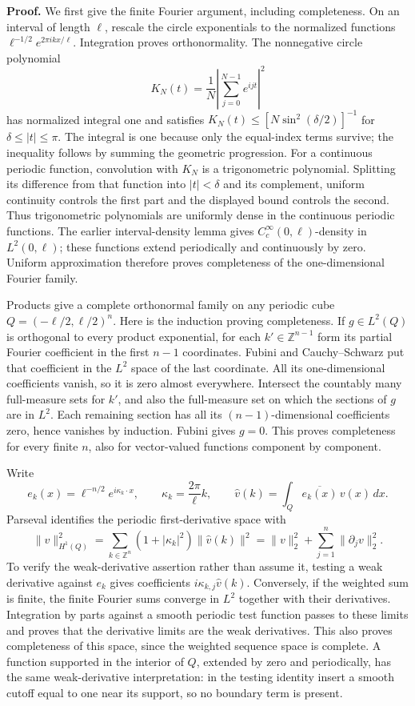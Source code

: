 \documentclass[
  11pt,
]{article}
\begin{document}
\textbf{Proof.} We first give the finite Fourier argument, including
completeness. On an interval of length \(\ell\), rescale the circle
exponentials to the normalized functions
\(\ell^{-1/2}e^{2\pi ikx/\ell}\). Integration proves orthonormality. The
nonnegative circle polynomial \[
K_N(t)=\frac1N\left|\sum_{j=0}^{N-1}e^{ijt}\right|^2
\] has normalized integral one and satisfies
\(K_N(t)\leq [N\sin^2(\delta/2)]^{-1}\) for \(\delta\leq |t|\leq\pi\).
The integral is one because only the equal-index terms survive; the
inequality follows by summing the geometric progression. For a
continuous periodic function, convolution with \(K_N\) is a
trigonometric polynomial. Splitting its difference from that function
into \(|t|<\delta\) and its complement, uniform continuity controls the
first part and the displayed bound controls the second. Thus
trigonometric polynomials are uniformly dense in the continuous periodic
functions. The earlier interval-density lemma gives
\(C_c^\infty(0,\ell)\)-density in \(L^2(0,\ell)\); these functions
extend periodically and continuously by zero. Uniform approximation
therefore proves completeness of the one-dimensional Fourier family.

Products give a complete orthonormal family on any periodic cube
\(Q=(-\ell/2,\ell/2)^n\). Here is the induction proving completeness. If
\(g\in L^2(Q)\) is orthogonal to every product exponential, for each
\(k'\in\mathbb Z^{n-1}\) form its partial Fourier coefficient in the
first \(n-1\) coordinates. Fubini and Cauchy--Schwarz put that
coefficient in the \(L^2\) space of the last coordinate. All its
one-dimensional coefficients vanish, so it is zero almost everywhere.
Intersect the countably many full-measure sets for \(k'\), and also the
full-measure set on which the sections of \(g\) are in \(L^2\). Each
remaining section has all its \((n-1)\)-dimensional coefficients zero,
hence vanishes by induction. Fubini gives \(g=0\). This proves
completeness for every finite \(n\), also for vector-valued functions
component by component.

Write \[
e_k(x)=\ell^{-n/2}e^{i\kappa_k\cdot x},
\qquad \kappa_k=\frac{2\pi}{\ell}k,
\qquad \widehat v(k)=\int_Q \overline{e_k(x)}\,v(x)\,dx .
\] Parseval identifies the periodic first-derivative space with \[
\|v\|_{H^1(Q)}^2
=\sum_{k\in\mathbb Z^n}(1+|\kappa_k|^2)\|\widehat v(k)\|^2
=\|v\|_2^2+\sum_{j=1}^n\|\partial_jv\|_2^2 .
\] To verify the weak-derivative assertion rather than assume it,
testing a weak derivative against \(e_k\) gives coefficients
\(i\kappa_{k,j}\widehat v(k)\). Conversely, if the weighted sum is
finite, the finite Fourier sums converge in \(L^2\) together with their
derivatives. Integration by parts against a smooth periodic test
function passes to these limits and proves that the derivative limits
are the weak derivatives. This also proves completeness of this space,
since the weighted sequence space is complete. A function supported in
the interior of \(Q\), extended by zero and periodically, has the same
weak-derivative interpretation: in the testing identity insert a smooth
cutoff equal to one near its support, so no boundary term is present.
\end{document}
